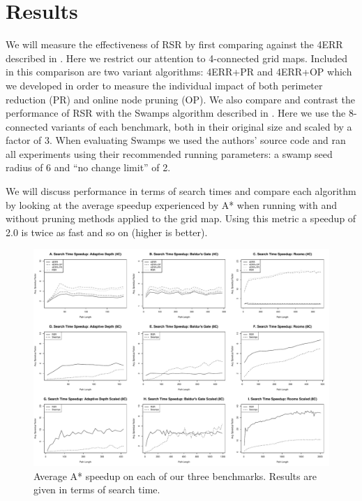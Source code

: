 \section{Results}
\label{sec-results}
We will measure the effectiveness of RSR by first comparing against the 4ERR
described in \cite{harabor10}. Here we restrict our attention to 4-connected
grid maps. Included in this comparison are two variant algorithms: 4ERR+PR and 
4ERR+OP which we developed in order to measure the individual impact of both
perimeter reduction (PR) and online node pruning (OP).
We also compare and contrast the performance of RSR
with the Swamps algorithm described in \cite{pochter10}.
Here we use the 8-connected variants of each benchmark, both in their original 
size and scaled by a factor of 3.
When evaluating Swamps we used the authors'
source code and ran all experiments using their recommended running parameters:
a swamp seed radius of 6 and ``no change limit'' of 2.  
\par 
We will discuss performance in terms of search times and compare each algorithm
by looking at the average speedup experienced by A* when running with and
without pruning methods applied to the grid map.  Using this metric a speedup of
2.0 is twice as fast and so on (higher is better).

\begin{figure}[t]
       \begin{center}
                       \includegraphics[width=1.95\columnwidth, trim = 10mm 10mm 10mm 0mm]{diagrams/speedup.pdf}
       \end{center}
       \caption{Average A* speedup on each of our three benchmarks. 
		Results are given in terms of search time.}
\label{fig-speedup}
\end{figure}

